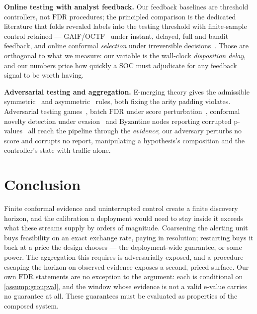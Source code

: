 \documentclass[conference]{IEEEtran}
\newcommand{\FDR}{\mathrm{FDR}}
\begin{document}
\textbf{Online testing with analyst feedback.} Our feedback baselines are threshold controllers, not
$\FDR$ procedures; the principled comparison is the dedicated literature that folds revealed labels into
the testing threshold with finite-sample control retained --- GAIF/OCTF~\cite{lu2026gaif} under instant,
delayed, full and bandit feedback, and online conformal \emph{selection} under irreversible
decisions~\cite{liu2025ocsarc}. Those are orthogonal to what we measure: our variable is the wall-clock
\emph{disposition delay}, and our numbers price how quickly a SOC must adjudicate for any feedback
signal to be worth having.

\textbf{Adversarial testing and aggregation.} E-merging theory gives the admissible
symmetric~\cite{vovk2021evalues} and asymmetric~\cite{wang2025admissible} rules, both fixing the arity
padding violates. Adversarial testing games~\cite{yasodharan2019nonzero}, batch $\FDR$ under score
perturbation~\cite{chen2024adversarialbh}, conformal novelty detection under
evasion~\cite{zhang2025conformalevasion} and Byzantine nodes reporting corrupted
p-values~\cite{zhang2025byzantine} all reach the pipeline through the \emph{evidence}; our adversary
perturbs no score and corrupts no report, manipulating a hypothesis's composition and the controller's
state with traffic alone.

\section{Conclusion}\label{sec:conclusion}

Finite conformal evidence and uninterrupted control create a finite discovery horizon, and the
calibration a deployment would need to stay inside it exceeds what these streams supply by orders of
magnitude. Coarsening the alerting unit buys feasibility on an exact exchange rate,
paying in resolution; restarting buys it back at a price the design chooses --- the deployment-wide
guarantee, or some power. The aggregation this requires is adversarially exposed, and a procedure
escaping the horizon on observed evidence exposes a second, priced surface. Our own $\FDR$ statements
are no exception to the argument: each is conditional on \cref{assump:groupval}, and the window whose
evidence is not a valid e-value carries no guarantee at all. These guarantees must be
evaluated as properties of the composed system.

\end{document}

